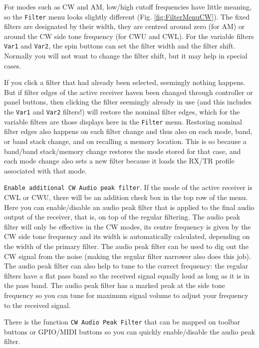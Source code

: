\documentclass[12pt]{book}
\def\rett#1{\texttt{\color{red}#1}}
\def\bltt#1{\texttt{\color{blue}#1}}
\begin{document}
For modes such as CW and AM, low/high cutoff frequencies have little meaning, so the
\bltt{Filter} menu looks slightly different (Fig. \ref{fig:FilterMenuCW}). The fixed
filters are designated by their width, they are centred around zero (for AM) or around
the CW side tone frequency (for CWU and CWL). For the variable filters \texttt{Var1}
and \texttt{Var2},
the spin buttons can set the filter width and the filter shift. Normally you will not
want to change the filter shift, but it may help in special cases.

If you click a filter that had already been selected, seemingly nothing happens.
But if filter edges of the active receiver haven been changed through
controller or panel buttons, then clicking the filter seemingly already in use
(and this includes the \texttt{Var1} and \texttt{Var2} filters!)
will restore the nominal filter edges, which for the variable filters are those
displays here in the \bltt{Filter} menu.
Restoring nominal filter edges also happens on each filter change and thus
also on each  mode, band, or band stack change, and on recalling a memory
location. This is so because a band/band stack/memory change restores
the mode stored for that case, and each mode change also sets a new filter
because it loads the RX/TR profile associated with that mode.

\rett{Enable additional CW Audio peak filter}. If the mode of the
active receiver is CWL or CWU, there will be an addition check box in the
top row of the menu. Here you can enable/disable an audio peak filter that
is applied to the final audio output of the receiver, that is, on top of
the regular filtering. The audio peak filter will only be effective in
the CW modes, its centre frequency is given by the CW side tone frequency
and its width is automatically calculated, depending on the
width of the primary filter. The audio peak filter can be used to dig out
the CW signal from the noise (making the regular filter narrower also
does this job). The audio peak filter can also help to tune to the correct
frequency: the regular filters have a flat pass band so the received
signal equally loud as long as it is in the pass band. The audio peak filter
has a marked peak at the side tone frequency so you can tune for maximum
signal volume to adjust your frequency to the received signal.

There is the function \bltt{CW Audio Peak Filter} that can be mapped on toolbar
buttons or GPIO/MIDI buttons so you can quickly enable/disable the audio peak
filter.
\end{document}
